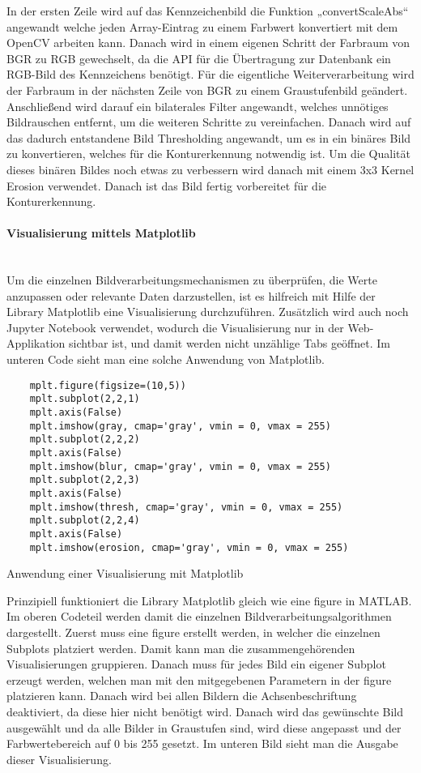 In der ersten Zeile wird auf das Kennzeichenbild die Funktion „convertScaleAbs“ angewandt welche jeden Array-Eintrag zu einem Farbwert konvertiert mit dem 
OpenCV arbeiten kann. Danach wird in einem eigenen Schritt der Farbraum von BGR zu RGB gewechselt, da die API für die Übertragung zur Datenbank ein RGB-Bild 
des Kennzeichens benötigt. Für die eigentliche Weiterverarbeitung wird der Farbraum in der nächsten Zeile von BGR zu einem Graustufenbild geändert. 
Anschließend wird darauf ein bilaterales Filter angewandt, welches unnötiges Bildrauschen entfernt, um die weiteren Schritte zu vereinfachen. Danach 
wird auf das dadurch entstandene Bild Thresholding angewandt, um es in ein binäres Bild zu konvertieren, welches für die Konturerkennung notwendig ist. 
Um die Qualität dieses binären Bildes noch etwas zu verbessern wird danach mit einem 3x3 Kernel Erosion verwendet. Danach ist das Bild fertig vorbereitet für die Konturerkennung.

\paragraph{Visualisierung mittels Matplotlib}\mbox{}\\

Um die einzelnen Bildverarbeitungsmechanismen zu überprüfen, die Werte anzupassen oder relevante Daten darzustellen, ist es hilfreich mit Hilfe der Library 
Matplotlib eine Visualisierung durchzuführen. Zusätzlich wird auch noch Jupyter Notebook verwendet, wodurch die Visualisierung nur in der Web-Applikation 
sichtbar ist, und damit werden nicht unzählige Tabs geöffnet. Im unteren Code sieht man eine solche Anwendung von Matplotlib.

\begin{listing}[H]
    \begin{verbatim}
    mplt.figure(figsize=(10,5))
    mplt.subplot(2,2,1)
    mplt.axis(False)
    mplt.imshow(gray, cmap='gray', vmin = 0, vmax = 255) 
    mplt.subplot(2,2,2)
    mplt.axis(False)
    mplt.imshow(blur, cmap='gray', vmin = 0, vmax = 255)
    mplt.subplot(2,2,3)
    mplt.axis(False)
    mplt.imshow(thresh, cmap='gray', vmin = 0, vmax = 255)
    mplt.subplot(2,2,4)
    mplt.axis(False)
    mplt.imshow(erosion, cmap='gray', vmin = 0, vmax = 255)
    \end{verbatim}
    \caption{Anwendung einer Visualisierung mit Matplotlib}
\end{listing}

Prinzipiell funktioniert die Library Matplotlib gleich wie eine figure in MATLAB. Im oberen Codeteil werden damit die einzelnen Bildverarbeitungsalgorithmen 
dargestellt. Zuerst muss eine figure erstellt werden, in welcher die einzelnen Subplots platziert werden. Damit kann man die zusammengehörenden Visualisierungen 
gruppieren. Danach muss für jedes Bild ein eigener Subplot erzeugt werden, welchen man mit den mitgegebenen Parametern in der figure platzieren kann. Danach 
wird bei allen Bildern die Achsenbeschriftung deaktiviert, da diese hier nicht benötigt wird. Danach wird das gewünschte Bild ausgewählt und da alle Bilder in 
Graustufen sind, wird diese angepasst und der Farbwertebereich auf 0 bis 255 gesetzt. Im unteren Bild sieht man die Ausgabe dieser Visualisierung.

